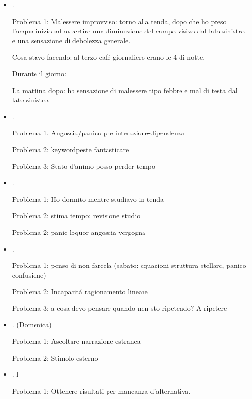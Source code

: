 \begin{itemize}
\item {}.

Problema 1: Malessere improvviso: torno alla tenda, dopo che ho preso l'acqua inizio ad avvertire una diminuzione del campo visivo dal lato sinistro e una sensazione di debolezza generale.

Cosa stavo facendo: al terzo caf\'e giornaliero erano le 4 di notte.

Durante il giorno:

La mattina dopo: ho sensazione di malessere tipo febbre e mal di testa dal lato sinistro.

\item {}.

Problema 1: Angoscia/panico pre interazione-dipendenza

Problema 2: keyword{peste fantasticare}

Problema 3: Stato d'animo posso perder tempo

\item {}.

Problema 1: Ho dormito mentre studiavo in tenda

Problema 2: stima tempo: revisione studio

Problema 2: panic loquor angoscia vergogna

\item {}.

Problema 1: penso di non farcela (sabato: equazioni struttura stellare, panico-confusione)

Problema 2: Incapacit\'a ragionamento lineare

Problema 3: a cosa devo pensare quando non sto ripetendo? A ripetere

\item {}.
(Domenica)

Problema 1: Ascoltare narrazione estranea

Problema 2: Stimolo esterno

\item {}.
l

Problema 1: Ottenere risultati per mancanza d'alternativa.


\end{itemize}
